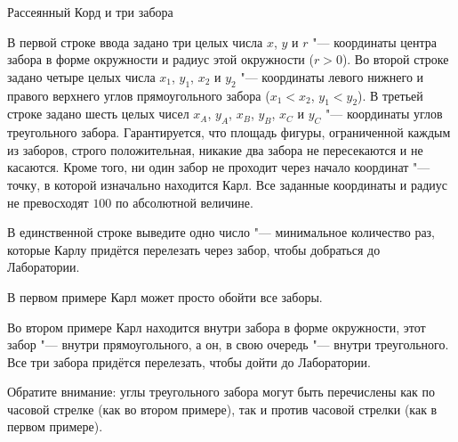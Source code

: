 \begin{problem}{Рассеянный Корд и три забора}
\InputFile

В первой строке ввода задано три целых числа $x$, $y$ и $r$ "--- координаты
центра забора в форме окружности и радиус этой окружности ($r > 0$).
Во второй строке задано четыре целых числа $x_1$, $y_1$, $x_2$ и $y_2$ "---
координаты левого нижнего и правого верхнего углов прямоугольного забора
($x_1 < x_2$, $y_1 < y_2$).
В третьей строке задано шесть целых чисел $x_A$, $y_A$, $x_B$, $y_B$,
$x_C$ и $y_C$ "--- координаты углов треугольного забора.
Гарантируется, что площадь фигуры, ограниченной каждым из заборов,
строго положительная, никакие два забора не пересекаются и не касаются.
Кроме того, ни один забор не проходит через начало координат "--- точку,
в которой изначально находится Карл.
Все заданные координаты и радиус не превосходят $100$ по абсолютной величине.

\OutputFile

В единственной строке выведите одно число "--- минимальное количество раз,
которые Карлу придётся перелезать через забор, чтобы добраться до Лаборатории.

\Examples

\begin{example}
%
%
\end{example}

\Explanations

В первом примере Карл может просто обойти все заборы.

Во втором примере Карл находится внутри забора в форме окружности,
этот забор "--- внутри прямоугольного, а он, в свою очередь "--- внутри
треугольного.
Все три забора придётся перелезать, чтобы дойти до Лаборатории.

Обратите внимание: углы треугольного забора могут быть перечислены
как по часовой стрелке (как во втором примере),
так и против часовой стрелки (как в первом примере).

\end{problem}

